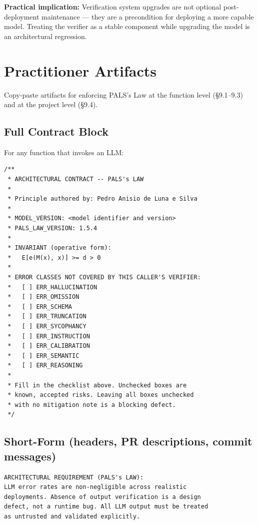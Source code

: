 \documentclass[11pt,a4paper]{article}
\begin{document}
\textbf{Practical implication:} Verification system upgrades are not optional post-deployment maintenance --- they are a precondition for deploying a more capable model. Treating the verifier as a stable component while upgrading the model is an architectural regression.

\section{Practitioner Artifacts}

Copy-paste artifacts for enforcing PALS's Law at the function level (\S9.1--9.3) and at the project level (\S9.4).

\subsection{Full Contract Block}

For any function that invokes an LLM:

\begin{lstlisting}[language={},title={\textbf{TypeScript contract block}}]
/**
 * ARCHITECTURAL CONTRACT -- PALS's LAW
 *
 * Principle authored by: Pedro Anisio de Luna e Silva
 *
 * MODEL_VERSION: <model identifier and version>
 * PALS_LAW_VERSION: 1.5.4
 *
 * INVARIANT (operative form):
 *   E[e(M(x), x)] >= d > 0
 *
 * ERROR CLASSES NOT COVERED BY THIS CALLER'S VERIFIER:
 *   [ ] ERR_HALLUCINATION
 *   [ ] ERR_OMISSION
 *   [ ] ERR_SCHEMA
 *   [ ] ERR_TRUNCATION
 *   [ ] ERR_SYCOPHANCY
 *   [ ] ERR_INSTRUCTION
 *   [ ] ERR_CALIBRATION
 *   [ ] ERR_SEMANTIC
 *   [ ] ERR_REASONING
 *
 * Fill in the checklist above. Unchecked boxes are
 * known, accepted risks. Leaving all boxes unchecked
 * with no mitigation note is a blocking defect.
 */
\end{lstlisting}

\subsection{Short-Form (headers, PR descriptions, commit messages)}

\begin{lstlisting}[language={}]
ARCHITECTURAL REQUIREMENT (PALS's LAW):
LLM error rates are non-negligible across realistic
deployments. Absence of output verification is a design
defect, not a runtime bug. All LLM output must be treated
as untrusted and validated explicitly.
\end{lstlisting}
\end{document}
